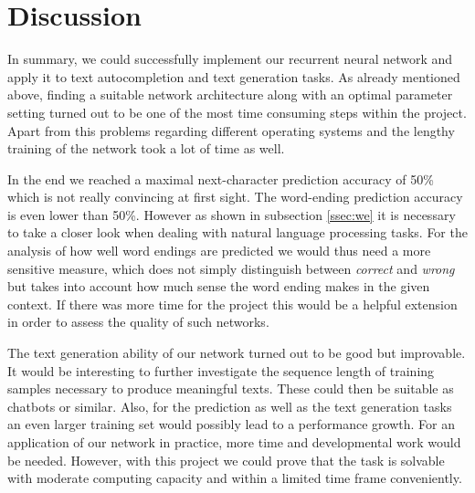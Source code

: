 \documentclass[11pt,a4paper,bibliography=totocnumbered,listof=totocnumbered]{scrartcl}
\begin{document}
\pagebreak
\section{Discussion}
In summary, we could successfully implement our recurrent neural network and apply it to text autocompletion and text generation tasks. As already mentioned above, finding a suitable network architecture along with an optimal parameter setting turned out to be one of the most time consuming steps within the project. Apart from this problems regarding different operating systems and the lengthy training of the network took a lot of time as well. 

In the end we reached a maximal next-character prediction accuracy of 50\% which is not really convincing at first sight. The word-ending prediction accuracy is even lower than 50\%. However as shown in subsection \ref{ssec:we} it is necessary to take a closer look when dealing with natural language processing tasks. For the analysis of how well word endings are predicted we would thus need a more sensitive measure, which does not simply distinguish between \textit{correct} and \textit{wrong} but takes into account how much sense the word ending makes in the given context. If there was more time for the project this would be a helpful extension in order to assess the quality of such networks. 

The text generation ability of our network turned out to be good but improvable. It would be interesting to further investigate the sequence length of training samples necessary to produce meaningful texts. These could then be suitable as chatbots or similar. Also, for the prediction as well as the text generation tasks an even larger training set would possibly lead to a performance growth. For an application of our network in practice, more time and developmental work would be needed. However, with this project we could prove that the task is solvable with moderate computing capacity and within a limited time frame conveniently. 

\pagebreak
\end{document}

